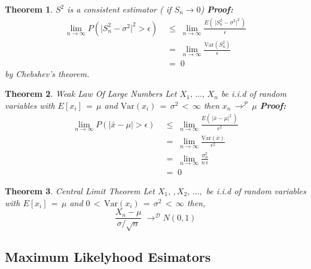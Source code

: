 \documentclass[10pt]{article}
\newtheorem{theorem}{Theorem}
\numberwithin{equation}{section}
\begin{document}
\noindent
\begin{theorem}{$S^{2}$ is a consistent estimator ( if $S_{n} \rightarrow 0$)}\newline
\textbf{Proof:}  
\begin{align}
\lim_{n \rightarrow \infty} P(\vert S_n^{2} - \sigma^{2} \vert^{2} > \epsilon) \; &\leq \; \lim_{n \rightarrow \infty} \frac{ E \left( \,\vert S_n^{2} - \sigma^{2} \vert^{2} \, \right)} {\epsilon} \\
&= \; \lim_{n \rightarrow \infty} \frac{ \text{Var}(S_n^2)}{\epsilon}\\
&= \; 0
\end{align}
by Chebshev's theorem.
\end{theorem}


\vspace{2mm}

\noindent
\begin{theorem}{Weak Law Of Large Numbers} \newline
Let $X_1, \, \ldots, \, X_n$ be i.i.d  of random variables with $E[x_i] \, = \, \mu$ and $\text{Var}(x_i) \, = \, \sigma^{2} \, < \, \infty$ then $x_n \, \rightarrow^{\mathcal{P}} \, \mu $
\textbf{Proof:}  
\begin{align}
\lim_{n \rightarrow \infty} P(\vert \bar{x} - \mu \vert > \epsilon) \; &\leq \; \lim_{n \rightarrow \infty} \frac{ E \left( \,\vert \bar{x} - \mu \vert^{2} \, \right)} {\epsilon^{2}} \\
&= \; \lim_{n \rightarrow \infty} \frac{ \text{Var}(\bar{x})}{\epsilon^{2}}\\
&= \; \lim_{n \rightarrow \infty} \frac{\sigma_{n}^{2}}{n \, \epsilon}\\
&= \; 0
\end{align}
\end{theorem}

\vspace{2mm}

\noindent
\begin{theorem}{Central Limit Theorem}\newline
Let $X_1, \, ,X_2, \,  \ldots, $ be i.i.d  of random variables with $E[x_i] \, = \, \mu$ and $0 \, < \, \text{Var}(x_i) \, = \, \sigma^{2} \, < \,  \infty$ then,
$$ \frac{X_{n} - \mu }{\sigma / \sqrt{n}} \; \rightarrow^{\mathcal{D}} N(0,1)$$
\end{theorem}


\subsection{Maximum Likelyhood Esimators}
\end{document}
